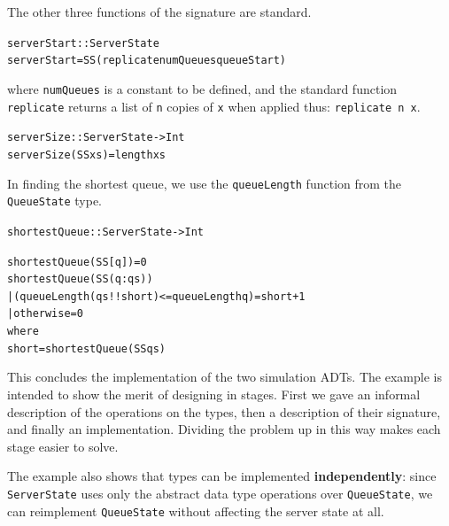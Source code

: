 The other three functions of the signature are standard.
\begin{alltt}
serverStart :: ServerState
serverStart = SS (replicate numQueues queueStart) 
\end{alltt}
where \texttt{numQueues} is a constant to be defined, and the standard function
\texttt{replicate} returns a list of \texttt{n} copies of \texttt{x} when applied thus: 
\texttt{replicate n x}.
\begin{alltt} 
serverSize :: ServerState -> Int
serverSize (SS xs) = length xs
\end{alltt}
In finding the shortest queue, we use the \texttt{queueLength} function from the
\texttt{QueueState} type.
\begin{alltt}
shortestQueue :: ServerState -> Int
 
shortestQueue (SS [q]) = 0
shortestQueue (SS (q:qs)) 
  | (queueLength (qs!!short) <= queueLength q)   = short+1
  | otherwise                                    = 0
      where
      short = shortestQueue (SS qs)
\end{alltt}
This concludes the implementation of the two simulation ADTs. The example
is intended to show the merit of designing in stages. First we gave an
informal description of  the operations on the types, then a description of
their signature, and finally an implementation. Dividing the problem up in
this way makes each stage easier to solve. 

The example also shows that types
can be implemented \textbf{independently}: since \texttt{ServerState} uses only the
abstract data type operations over \texttt{QueueState}, we can reimplement  
\texttt{QueueState} without affecting the server state at all.


